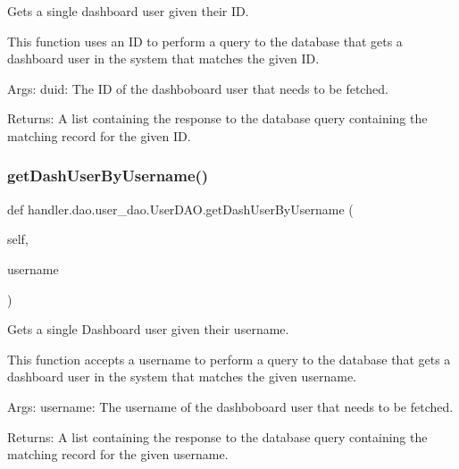 \begin{DoxyVerb}Gets a single dashboard user given their ID.

This function uses an ID to perform a query to the database that
gets a dashboard user in the system that matches the given ID.

Args:
    duid: The ID of the dashboboard user that needs to be fetched.

Returns:
    A list containing the response to the database query
    containing the matching record for the given ID.
\end{DoxyVerb}
 \mbox{\label{classhandler_1_1dao_1_1user__dao_1_1_user_d_a_o_a8c86f277f03acade4ca12983f0a05d10}} 
\subsubsection{\texorpdfstring{get\+Dash\+User\+By\+Username()}{getDashUserByUsername()}}
{\footnotesize\ttfamily def handler.\+dao.\+user\+\_\+dao.\+User\+D\+A\+O.\+get\+Dash\+User\+By\+Username (\begin{DoxyParamCaption}\item[{}]{self,  }\item[{}]{username }\end{DoxyParamCaption})}

\begin{DoxyVerb}Gets a single Dashboard user given their username.

This function accepts a username to perform a query to the database that
gets a dashboard user in the system that matches the given username.

Args:
    username: The username of the dashboboard user that needs to be fetched.

Returns:
    A list containing the response to the database query
    containing the matching record for the given username.
\end{DoxyVerb}
 \mbox{\label{classhandler_1_1dao_1_1user__dao_1_1_user_d_a_o_aa2275f3d06d7b6e83597600c1e6eccbd}} 
